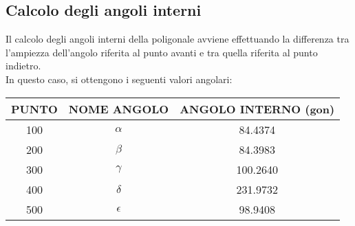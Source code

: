 \subsection{Calcolo degli angoli interni}
Il calcolo degli angoli interni della poligonale avviene effettuando la differenza tra l'ampiezza dell'angolo riferita al punto avanti e tra quella riferita al punto indietro.\\
In questo caso, si ottengono i seguenti valori angolari:
\begin{table}[H] \centering
\begin{tabular}{ccc}
\toprule
PUNTO & NOME ANGOLO             & ANGOLO INTERNO (gon) \\
\midrule
100   & $\alpha$   & 84.4374        \\
200   & $\beta$    & 84.3983        \\
300   & $\gamma$   & 100.2640       \\
400   & $\delta$   & 231.9732       \\
500   & $\epsilon$ & 98.9408       \\
\bottomrule
\end{tabular}
\end{table}

